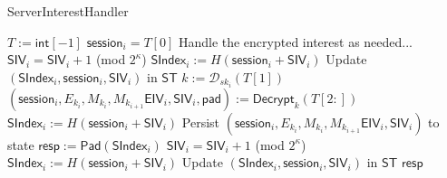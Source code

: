 \documentclass[10pt]{article}
\begin{document}
\begin{algorithm}[ht!]
  \caption{{\sf ServerInterestHandler}}
  \begin{algorithmic}[1]
  \State $T := \mathsf{int}[-1]$
  \State $\mathsf{session}_i = T[0]$
   
    \State Handle the encrypted interest as needed...
    \State $\mathsf{SIV}_i = \mathsf{SIV}_i + 1$ (mod $2^{\kappa}$)
    \State $\mathsf{SIndex}_i := H(\mathsf{session}_i + \mathsf{SIV}_i)$
    \State Update $(\mathsf{SIndex}_i, \mathsf{session}_i, \mathsf{SIV}_i)$ in $\mathsf{ST}$
  \Else {}
    \State $k := \mathcal{D}_{sk_i}(T[1])$
    \State $(\mathsf{session}_i, E_{k_i}, M_{k_i}, M_{k_{i+1}} \mathsf{EIV}_i, \mathsf{SIV}_i, \mathsf{pad}) := \mathsf{Decrypt}_k(T[2:])$
    \State $\mathsf{SIndex}_i := H(\mathsf{session}_i + \mathsf{SIV}_i)$
    \State Persist $(\mathsf{session}_i, E_{k_i}, M_{k_i}, M_{k_{i+1}} \mathsf{EIV}_i, \mathsf{SIV}_i)$ to state 
    \State $\mathsf{resp} := \mathsf{Pad}(\mathsf{SIndex}_i)$ 
    \State $\mathsf{SIV}_i = \mathsf{SIV}_i + 1$ (mod $2^{\kappa}$)
    \State $\mathsf{SIndex}_i := H(\mathsf{session}_i + \mathsf{SIV}_i)$
    \State Update $(\mathsf{SIndex}_i, \mathsf{session}_i, \mathsf{SIV}_i)$ in $\mathsf{ST}$
    \State \Return $\mathsf{resp}$
  \EndIf

    


  


  \end{algorithmic}
\end{algorithm}
\end{document}
